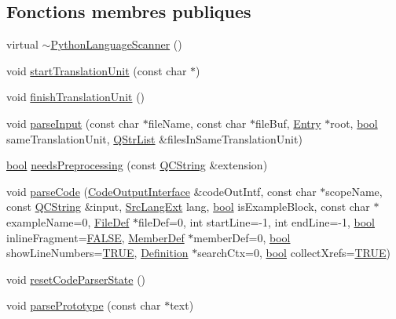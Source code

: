 \subsection*{Fonctions membres publiques}
\begin{DoxyCompactItemize}
\item 
virtual \hyperlink{class_python_language_scanner_ab98702799ad6f7d152e5de03581f5675}{$\sim$\+Python\+Language\+Scanner} ()
\item 
void \hyperlink{class_python_language_scanner_ae67929ac5a3d38fc925157f7a5f43497}{start\+Translation\+Unit} (const char $\ast$)
\item 
void \hyperlink{class_python_language_scanner_a97ca623055615c143e63ea98be819f86}{finish\+Translation\+Unit} ()
\item 
void \hyperlink{class_python_language_scanner_a6848c585fe2a19cd36ed34540dc3fdce}{parse\+Input} (const char $\ast$file\+Name, const char $\ast$file\+Buf, \hyperlink{class_entry}{Entry} $\ast$root, \hyperlink{qglobal_8h_a1062901a7428fdd9c7f180f5e01ea056}{bool} same\+Translation\+Unit, \hyperlink{class_q_str_list}{Q\+Str\+List} \&files\+In\+Same\+Translation\+Unit)
\item 
\hyperlink{qglobal_8h_a1062901a7428fdd9c7f180f5e01ea056}{bool} \hyperlink{class_python_language_scanner_a7c6ce0a95e477374182374a9f5bb2e2f}{needs\+Preprocessing} (const \hyperlink{class_q_c_string}{Q\+C\+String} \&extension)
\item 
void \hyperlink{class_python_language_scanner_a0920a8f0a1fc295f0e9c240aee99012c}{parse\+Code} (\hyperlink{class_code_output_interface}{Code\+Output\+Interface} \&code\+Out\+Intf, const char $\ast$scope\+Name, const \hyperlink{class_q_c_string}{Q\+C\+String} \&input, \hyperlink{types_8h_a9974623ce72fc23df5d64426b9178bf2}{Src\+Lang\+Ext} lang, \hyperlink{qglobal_8h_a1062901a7428fdd9c7f180f5e01ea056}{bool} is\+Example\+Block, const char $\ast$example\+Name=0, \hyperlink{class_file_def}{File\+Def} $\ast$file\+Def=0, int start\+Line=-\/1, int end\+Line=-\/1, \hyperlink{qglobal_8h_a1062901a7428fdd9c7f180f5e01ea056}{bool} inline\+Fragment=\hyperlink{qglobal_8h_a10e004b6916e78ff4ea8379be80b80cc}{F\+A\+L\+S\+E}, \hyperlink{class_member_def}{Member\+Def} $\ast$member\+Def=0, \hyperlink{qglobal_8h_a1062901a7428fdd9c7f180f5e01ea056}{bool} show\+Line\+Numbers=\hyperlink{qglobal_8h_a04a6422a52070f0dc478693da640242b}{T\+R\+U\+E}, \hyperlink{class_definition}{Definition} $\ast$search\+Ctx=0, \hyperlink{qglobal_8h_a1062901a7428fdd9c7f180f5e01ea056}{bool} collect\+Xrefs=\hyperlink{qglobal_8h_a04a6422a52070f0dc478693da640242b}{T\+R\+U\+E})
\item 
void \hyperlink{class_python_language_scanner_a7d8f587a1753e7d04dee2b5ddbc6c1df}{reset\+Code\+Parser\+State} ()
\item 
void \hyperlink{class_python_language_scanner_a114cb3ee5e45f0eb07829faa2868e31e}{parse\+Prototype} (const char $\ast$text)
\end{DoxyCompactItemize}


